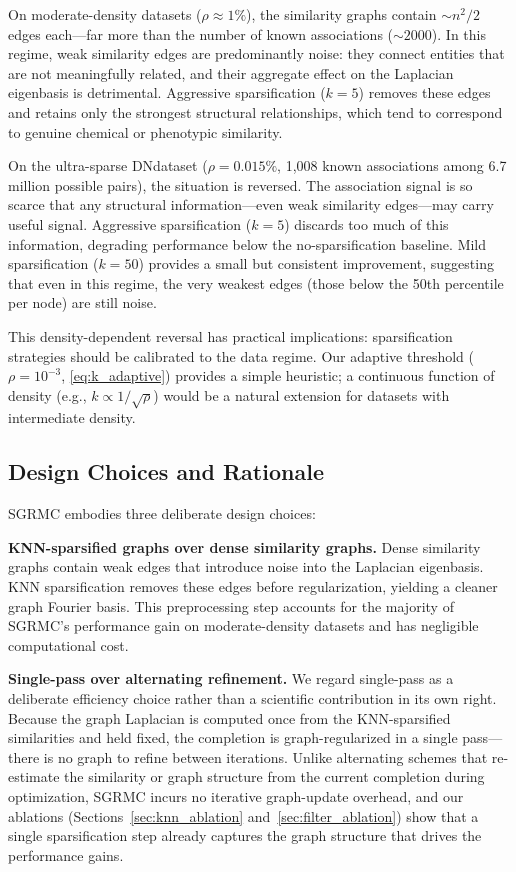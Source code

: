 \documentclass[webpdf,modern,large]{oup-authoring-template}
\begin{document}
On moderate-density datasets ($\rho \approx 1\%$), the similarity graphs contain $\sim n^2/2$ edges each---far more than the number of known associations (${\sim}2000$). In this regime, weak similarity edges are predominantly noise: they connect entities that are not meaningfully related, and their aggregate effect on the Laplacian eigenbasis is detrimental. Aggressive sparsification ($k=5$) removes these edges and retains only the strongest structural relationships, which tend to correspond to genuine chemical or phenotypic similarity.

On the ultra-sparse DNdataset ($\rho = 0.015\%$, 1,008 known associations among 6.7 million possible pairs), the situation is reversed. The association signal is so scarce that any structural information---even weak similarity edges---may carry useful signal. Aggressive sparsification ($k=5$) discards too much of this information, degrading performance below the no-sparsification baseline. Mild sparsification ($k=50$) provides a small but consistent improvement, suggesting that even in this regime, the very weakest edges (those below the 50th percentile per node) are still noise.

This density-dependent reversal has practical implications: sparsification strategies should be calibrated to the data regime. Our adaptive threshold ($\rho = 10^{-3}$, \eqref{eq:k_adaptive}) provides a simple heuristic; a continuous function of density (e.g., $k \propto 1/\sqrt{\rho}$) would be a natural extension for datasets with intermediate density.

\subsection{Design Choices and Rationale}

SGRMC embodies three deliberate design choices:

\noindent\textbf{KNN-sparsified graphs over dense similarity graphs.}
Dense similarity graphs contain weak edges that introduce noise into the Laplacian eigenbasis. KNN sparsification removes these edges before regularization, yielding a cleaner graph Fourier basis. This preprocessing step accounts for the majority of SGRMC's performance gain on moderate-density datasets and has negligible computational cost.

\noindent\textbf{Single-pass over alternating refinement.}
We regard single-pass as a deliberate efficiency choice rather than a scientific contribution in its own right. Because the graph Laplacian is computed once from the KNN-sparsified similarities and held fixed, the completion is graph-regularized in a single pass---there is no graph to refine between iterations. Unlike alternating schemes that re-estimate the similarity or graph structure from the current completion during optimization, SGRMC incurs no iterative graph-update overhead, and our ablations (Sections~\ref{sec:knn_ablation} and~\ref{sec:filter_ablation}) show that a single sparsification step already captures the graph structure that drives the performance gains.
\end{document}
